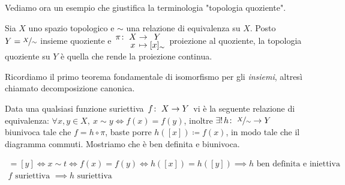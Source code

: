 Vediamo ora un esempio che giustifica la terminologia "topologia quoziente".
\begin{example}
	Sia $X$ uno spazio topologico e $\sim$ una relazione di equivalenza su $X$. Posto $Y=\nicefrac{X}{\sim}$ insieme quoziente e $\funztot \pi X Y x {[x]_\sim}$ proiezione al quoziente, la topologia quoziente su $Y$ è quella che rende la proiezione continua.
\end{example}


Ricordiamo il primo teorema fondamentale di isomorfismo per gli \textit{insiemi}, altresì chiamato decomposizione canonica.\newline
	\begin{minipage}[t]{0.83\textwidth}
		Data una qualsiasi funzione suriettiva $\funz f X Y$ vi è la seguente relazione di equivalenza: $\displaystyle \forall x,y\in X, \ x\sim y \iff f(x)=f(y)$, inoltre $\exists ! \funz h {\nicefrac{X}{\sim}} Y$ biunivoca tale che $f=h\circ\pi$, baste porre $h\left( [x] \right) \coloneqq f(x)$, in modo tale che il diagramma commuti. Mostriamo che è ben definita e biunivoca.
	\end{minipage}
	\begin{minipage}[t]{0.13\textwidth}\vspace{-10pt}
	\end{minipage}
	\begin{gather*}
		[x]=[y]\iff x\sim t\iff f(x)=f(y)\iff h([x])=h([y]) \implies h \text{ ben definita e iniettiva }\\
		f \text{ suriettiva } \implies h \text{ suriettiva}
	\end{gather*}

